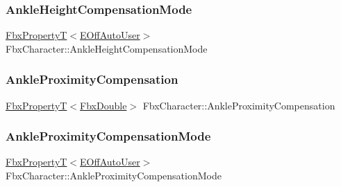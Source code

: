 \mbox{\label{class_fbx_character_a8c6ef4f12810113156cfbe6c580c0386}} 
\subsubsection{\texorpdfstring{Ankle\+Height\+Compensation\+Mode}{AnkleHeightCompensationMode}}
{\footnotesize\ttfamily \hyperlink{class_fbx_property_t}{Fbx\+PropertyT}$<$\hyperlink{class_fbx_character_ab698a180e6f900ba8317257749c2ecce}{E\+Off\+Auto\+User}$>$ Fbx\+Character\+::\+Ankle\+Height\+Compensation\+Mode}

\mbox{\label{class_fbx_character_aa1d39ce9313df0fe4b472c446e66225c}} 
\subsubsection{\texorpdfstring{Ankle\+Proximity\+Compensation}{AnkleProximityCompensation}}
{\footnotesize\ttfamily \hyperlink{class_fbx_property_t}{Fbx\+PropertyT}$<$\hyperlink{fbxtypes_8h_a171e72a1c46fc15c1a6c9c31948c1c5b}{Fbx\+Double}$>$ Fbx\+Character\+::\+Ankle\+Proximity\+Compensation}

\mbox{\label{class_fbx_character_a13fbced2f7ec82a05ec62aa84bc9b686}} 
\subsubsection{\texorpdfstring{Ankle\+Proximity\+Compensation\+Mode}{AnkleProximityCompensationMode}}
{\footnotesize\ttfamily \hyperlink{class_fbx_property_t}{Fbx\+PropertyT}$<$\hyperlink{class_fbx_character_ab698a180e6f900ba8317257749c2ecce}{E\+Off\+Auto\+User}$>$ Fbx\+Character\+::\+Ankle\+Proximity\+Compensation\+Mode}

